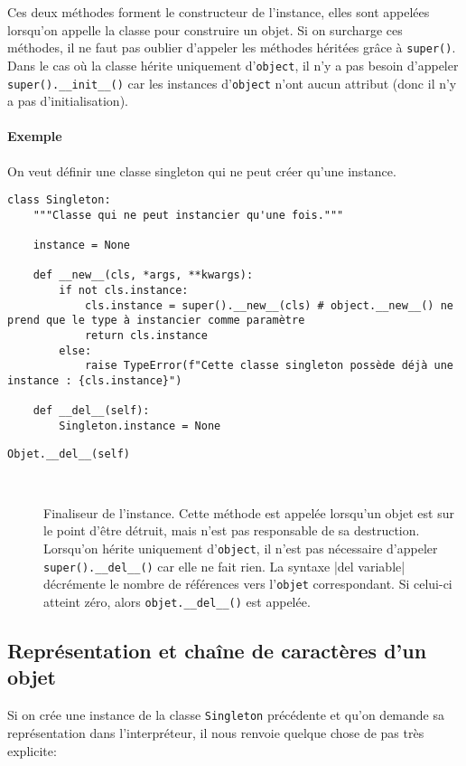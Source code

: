 Ces deux méthodes forment le constructeur\label{constructeur} de l'instance, elles sont appelées lorsqu'on appelle la classe pour construire un objet. Si on surcharge ces méthodes, il ne faut pas oublier d'appeler les méthodes héritées grâce à \texttt{super()}. Dans le cas où la classe hérite uniquement d'\texttt{object}, il n'y a pas besoin d'appeler \texttt{super().__init__()} car les instances d'\texttt{object} n'ont aucun attribut (donc il n'y a pas d'initialisation).

\paragraph{Exemple} On veut définir une classe \og singleton \fg{} qui ne peut créer qu'une instance.

\begin{verbatim}
class Singleton:
    """Classe qui ne peut instancier qu'une fois."""

    instance = None

    def __new__(cls, *args, **kwargs):
        if not cls.instance:
            cls.instance = super().__new__(cls) # object.__new__() ne prend que le type à instancier comme paramètre
            return cls.instance
        else:
            raise TypeError(f"Cette classe singleton possède déjà une instance : {cls.instance}")

    def __del__(self):
        Singleton.instance = None
\end{verbatim}

\begin{description}
    \item[\texttt{Objet.__del__(self)}]~

    Finaliseur de l'instance. Cette méthode est appelée lorsqu'un objet est sur le point d'être détruit, mais n'est pas responsable de sa destruction. Lorsqu'on hérite uniquement d'\texttt{object}, il n'est pas nécessaire d'appeler \texttt{super().__del__()} car elle ne fait rien. La syntaxe |del variable| décrémente le nombre de références vers l'\texttt{objet} correspondant. Si celui-ci atteint zéro, alors \texttt{objet.__del__()} est appelée.
\end{description}

\subsection{Représentation et chaîne de caractères d'un objet}
Si on crée une instance de la classe \texttt{Singleton} précédente et qu'on demande sa représentation dans l'interpréteur, il nous renvoie quelque chose de pas très explicite:

